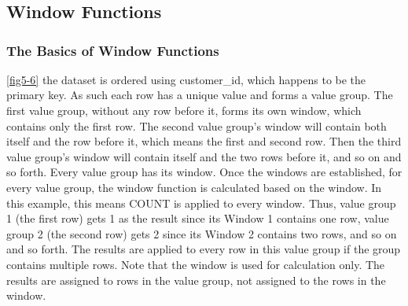 \chapter{\label{ch05}}
\section{Window Functions}
\subsection{The Basics of Window Functions}

\autoref{fig5-6} the dataset is ordered using customer\_id, which happens to be the primary key. As such each row has a unique value and forms a value group. The first value group, without any row before it, forms its own window, which contains only the first row. The second value group's window will contain both itself and the row before it, which means the first and second row. Then the third value group's window will contain itself and the two rows before it, and so on and so forth. Every value group has its window. Once the windows are established, for every value group, the window function is calculated based on the window. In this example, this means COUNT is applied to every window. Thus, value group 1 (the first row) gets 1 as the result since its Window 1 contains one row, value group 2 (the second row) gets 2 since its Window 2 contains two rows, and so on and so forth. The results are applied to every row in this value group if the group contains multiple rows. Note that the window is used for calculation only. The results are assigned to rows in the value group, not assigned to the rows in the window.